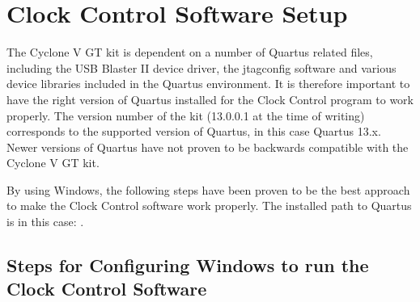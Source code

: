 \documentclass[main.tex]{subfiles}
\begin{document}
\chapter{Clock Control Software Setup} \label{chap:clksetup}

The Cyclone V GT kit is dependent on a number of Quartus related files, including the USB Blaster II device driver, the jtagconfig software and various device libraries included in the Quartus environment. It is therefore important to have the right version of Quartus installed for the Clock Control program to work properly. The version number of the kit (13.0.0.1 at the time of writing) corresponds to the supported version of Quartus, in this case Quartus 13.x. Newer versions of Quartus have not proven to be backwards compatible with the Cyclone V GT kit.

By using Windows, the following steps have been proven to be the best approach to make the Clock Control software work properly. The installed path to Quartus is in this case: .\\

\section{Steps for Configuring Windows to run the Clock Control Software}
\end{document}
